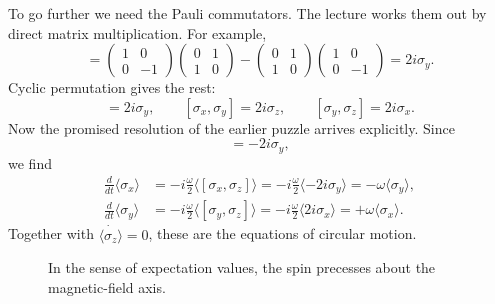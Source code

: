 To go further we need the Pauli commutators. The lecture works them out by direct matrix multiplication. For example,
\begin{equation}
[\sigma_z,\sigma_x]
=
\begin{pmatrix}
1&0\\
0&-1
\end{pmatrix}
\begin{pmatrix}
0&1\\
1&0
\end{pmatrix}
-
\begin{pmatrix}
0&1\\
1&0
\end{pmatrix}
\begin{pmatrix}
1&0\\
0&-1
\end{pmatrix}
=
2i\sigma_y.
\end{equation}
Cyclic permutation gives the rest:
\begin{equation}
[\sigma_z,\sigma_x]=2i\sigma_y,
\qquad
[\sigma_x,\sigma_y]=2i\sigma_z,
\qquad
[\sigma_y,\sigma_z]=2i\sigma_x.
\end{equation}
Now the promised resolution of the earlier puzzle arrives explicitly. Since
\begin{equation}
[\sigma_x,\sigma_z]=-2i\sigma_y,
\end{equation}
we find
\begin{align}
\frac{d}{dt}\langle \sigma_x\rangle
&=
-i\frac{\omega}{2}\langle[\sigma_x,\sigma_z]\rangle
=
-i\frac{\omega}{2}\langle -2i\sigma_y\rangle
=
-\omega \langle \sigma_y\rangle,\\
\frac{d}{dt}\langle \sigma_y\rangle
&=
-i\frac{\omega}{2}\langle[\sigma_y,\sigma_z]\rangle
=
-i\frac{\omega}{2}\langle 2i\sigma_x\rangle
=
+\omega \langle \sigma_x\rangle.
\end{align}
Together with \(\dot{\langle \sigma_z\rangle}=0\), these are the equations of circular motion.

\begin{figure}[ht]
\centering
{}
\caption{In the sense of expectation values, the spin precesses about the magnetic-field axis.}
\end{figure}


